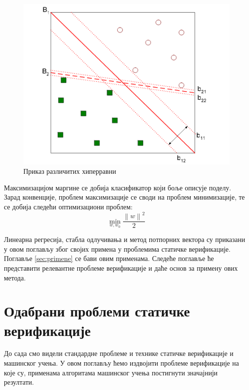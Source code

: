 \documentclass[a4paper]{article}
\newcommand{\norm}[1]{\left\lVert#1\right\rVert}
\begin{document}
{\begin{figure}[h!]
\begin{center}
\includegraphics[scale=0.4]{./slike/svm.png}
\end{center}
\caption{Приказ различитих хиперравни}
\label{fig:svm}
\end{figure}

Максимизацијом маргине се добија класификатор који боље описује поделу. Зарад конвенције, проблем максимизације се своди на проблем минимизације, те се добија следећи оптимизациони проблем:
\begin{equation}
    \min_{w, w_0} \frac{ {\norm{w}}^2 }{2}
\end{equation}


Линеарна регресија, стабла одлучивања и метод потпорних вектора су приказани у овом поглављу због својих примена у проблемима статичке верификације. Поглавље \ref{sec:primene} се бави овим применама. Следеће поглавље ће представити релевантне проблеме верификације и даће основ за примену ових метода.

\section{Одабрани проблеми статичке верификације}
До сада смо видели стандардне проблеме и технике статичке верификације и машинског учења. У овом поглављу ћемо издвојити проблеме верификације на које су, применама алгоритама машинског учења постигнути значајнији резултати.


}
\end{document}

